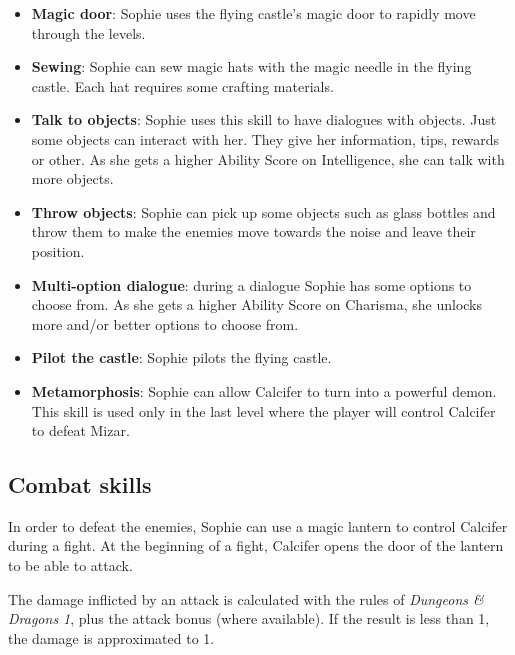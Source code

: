 \begin{itemize}
\item \textbf{Magic door}: Sophie uses the flying castle's magic door to rapidly move through the levels.
\item \textbf{Sewing}: Sophie can sew magic hats with the magic needle in the flying castle. Each hat requires some crafting materials.
\item \textbf{Talk to objects}: Sophie uses this skill to have dialogues with objects. Just some objects can interact with her. They give her information, tips, rewards or other. As she gets a higher Ability Score on Intelligence, she can talk with more objects.
\item \textbf{Throw objects}: Sophie can pick up some objects such as glass bottles and throw them to make the enemies move towards the noise and leave their position.
\item \textbf{Multi-option dialogue}: during a dialogue Sophie has some options to choose from. As she gets a higher Ability Score on Charisma, she unlocks more and/or better options to choose from.
\item \textbf{Pilot the castle}: Sophie pilots the flying castle.
\item \textbf{Metamorphosis}: Sophie can allow Calcifer to turn into a powerful demon. This skill is used only in the last level where the player will control Calcifer to defeat Mizar.
\end{itemize}

\subsection{Combat skills}
In order to defeat the enemies, Sophie can use a magic lantern to control Calcifer during a fight. At the beginning of a fight, Calcifer opens the door of the lantern to be able to attack.

The damage inflicted by an attack is calculated with the rules of \textit{Dungeons \& Dragons 1}, plus the attack bonus (where available). If the result is less than 1, the damage is approximated to 1.

